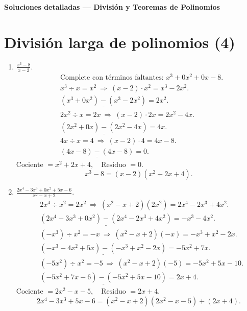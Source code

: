 \documentclass[14pt]{extarticle}
\begin{document}
	
	\noindent\textbf{Soluciones detalladas — División y Teoremas de Polinomios}
	
	\section*{División larga de polinomios (4)}
	\begin{enumerate}[label=(\arabic*)]
		\item \(\displaystyle \frac{x^{3}-8}{x-2}\).
		\[
		\begin{aligned}
			&\text{Complete con términos faltantes: }x^{3}+0x^{2}+0x-8.\\
			&x^{3}\div x = x^{2}\ \Rightarrow\ (x-2)\cdot x^{2}=x^{3}-2x^{2}.\\
			&\underline{(x^{3}+0x^{2})-(x^{3}-2x^{2})}=2x^{2}.\\
			&2x^{2}\div x=2x\ \Rightarrow\ (x-2)\cdot 2x=2x^{2}-4x.\\
			&\underline{(2x^{2}+0x)-(2x^{2}-4x)}=4x.\\
			&4x\div x=4\ \Rightarrow\ (x-2)\cdot 4=4x-8.\\
			&\underline{(4x-8)-(4x-8)}=0.
		\end{aligned}
		\]
		\(\boxed{\text{Cociente }=x^{2}+2x+4,\quad \text{Residuo }=0}\).
		\[
		x^{3}-8=(x-2)(x^{2}+2x+4).
		\]
		
		\item \(\displaystyle \frac{2x^{4}-3x^{3}+0x^{2}+5x-6}{x^{2}-x+2}\).
		\[
		\begin{aligned}
			&2x^{4}\div x^{2}=2x^{2}\ \Rightarrow\ (x^{2}-x+2)(2x^{2})=2x^{4}-2x^{3}+4x^{2}.\\
			&\underline{(2x^{4}-3x^{3}+0x^{2})-(2x^{4}-2x^{3}+4x^{2})}=-x^{3}-4x^{2}.\\[2pt]
			&(-x^{3})\div x^{2}=-x\ \Rightarrow\ (x^{2}-x+2)(-x)=-x^{3}+x^{2}-2x.\\
			&\underline{(-x^{3}-4x^{2}+5x)-(-x^{3}+x^{2}-2x)}=-5x^{2}+7x.\\[2pt]
			&(-5x^{2})\div x^{2}=-5\ \Rightarrow\ (x^{2}-x+2)(-5)=-5x^{2}+5x-10.\\
			&\underline{(-5x^{2}+7x-6)-(-5x^{2}+5x-10)}=2x+4.
		\end{aligned}
		\]
		\(\boxed{\text{Cociente }=2x^{2}-x-5,\quad \text{Residuo }=2x+4}\).
		\[
		2x^{4}-3x^{3}+5x-6=(x^{2}-x+2)(2x^{2}-x-5)+(2x+4).
		\]
		

\end{enumerate}
\end{document}
